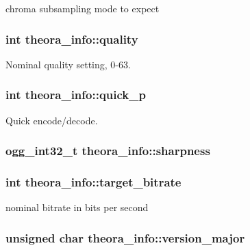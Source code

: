 chroma subsampling mode to expect 

\subsubsection{\setlength{\rightskip}{0pt plus 5cm}int \bf{theora\_\-info::quality}}\label{structtheora__info_71a4748a5f31bd58d0e403b7806c980d}


Nominal quality setting, 0-63. 

\subsubsection{\setlength{\rightskip}{0pt plus 5cm}int \bf{theora\_\-info::quick\_\-p}}\label{structtheora__info_2dfae4fd175dbd19254eaf0697778ff5}


Quick encode/decode. 

\subsubsection{\setlength{\rightskip}{0pt plus 5cm}ogg\_\-int32\_\-t \bf{theora\_\-info::sharpness}}\label{structtheora__info_3fb695de2b2f56dd0203b9e2eb0df1cc}


\subsubsection{\setlength{\rightskip}{0pt plus 5cm}int \bf{theora\_\-info::target\_\-bitrate}}\label{structtheora__info_0cfba041767ae2416dd190a406afe713}


nominal bitrate in bits per second 

\subsubsection{\setlength{\rightskip}{0pt plus 5cm}unsigned char \bf{theora\_\-info::version\_\-major}}\label{structtheora__info_7c5ebb9e6700aaef87f29f7c6074e474}


